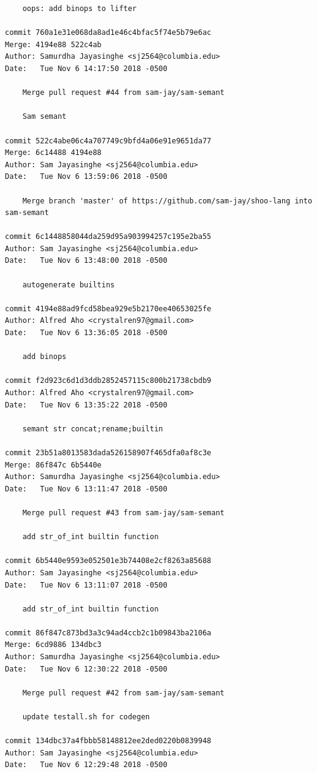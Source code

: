 \documentclass[12pt]{article}
\begin{document}
\begin{lstlisting}
    oops: add binops to lifter

commit 760a1e31e068da8ad1e46c4bfac5f74e5b79e6ac
Merge: 4194e88 522c4ab
Author: Samurdha Jayasinghe <sj2564@columbia.edu>
Date:   Tue Nov 6 14:17:50 2018 -0500

    Merge pull request #44 from sam-jay/sam-semant
    
    Sam semant

commit 522c4abe06c4a707749c9bfd4a06e91e9651da77
Merge: 6c14488 4194e88
Author: Sam Jayasinghe <sj2564@columbia.edu>
Date:   Tue Nov 6 13:59:06 2018 -0500

    Merge branch 'master' of https://github.com/sam-jay/shoo-lang into sam-semant

commit 6c1448858044da259d95a903994257c195e2ba55
Author: Sam Jayasinghe <sj2564@columbia.edu>
Date:   Tue Nov 6 13:48:00 2018 -0500

    autogenerate builtins

commit 4194e88ad9fcd58bea929e5b2170ee40653025fe
Author: Alfred Aho <crystalren97@gmail.com>
Date:   Tue Nov 6 13:36:05 2018 -0500

    add binops

commit f2d923c6d1d3ddb2852457115c800b21738cbdb9
Author: Alfred Aho <crystalren97@gmail.com>
Date:   Tue Nov 6 13:35:22 2018 -0500

    semant str concat;rename;builtin

commit 23b51a8013583dada526158907f465dfa0af8c3e
Merge: 86f847c 6b5440e
Author: Samurdha Jayasinghe <sj2564@columbia.edu>
Date:   Tue Nov 6 13:11:47 2018 -0500

    Merge pull request #43 from sam-jay/sam-semant
    
    add str_of_int builtin function

commit 6b5440e9593e052501e3b74408e2cf8263a85688
Author: Sam Jayasinghe <sj2564@columbia.edu>
Date:   Tue Nov 6 13:11:07 2018 -0500

    add str_of_int builtin function

commit 86f847c873bd3a3c94ad4ccb2c1b09843ba2106a
Merge: 6cd9886 134dbc3
Author: Samurdha Jayasinghe <sj2564@columbia.edu>
Date:   Tue Nov 6 12:30:22 2018 -0500

    Merge pull request #42 from sam-jay/sam-semant
    
    update testall.sh for codegen

commit 134dbc37a4fbbb58148812ee2ded0220b0839948
Author: Sam Jayasinghe <sj2564@columbia.edu>
Date:   Tue Nov 6 12:29:48 2018 -0500


\end{lstlisting}
\end{document}
